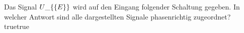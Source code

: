     {Das Signal $U\_\{\textrm\{E\}\}$ wird auf den Eingang folgender Schaltung gegeben. In welcher Antwort sind alle dargestellten Signale phasenrichtig zugeordnet?}
    {}
    {}
    {}
    {}
    {true}{true}